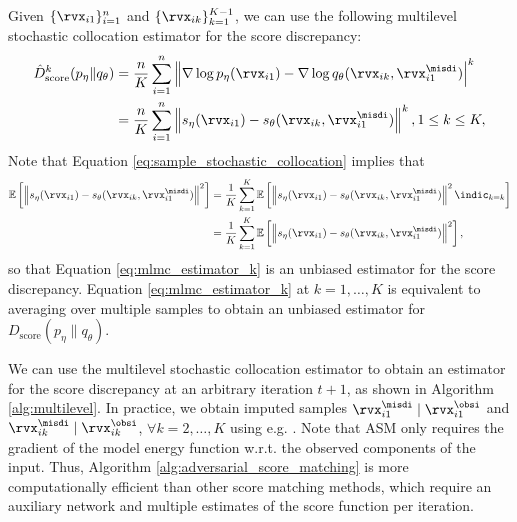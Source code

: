 \documentclass{article} %
\begin{document}
Given $\{\rvx_{i1}\}_{i=1}^{n}$ and $\{\rvx_{ik}\}_{k=1}^{K-1}$, we can use the following multilevel stochastic collocation estimator for the score discrepancy:
\begin{align}
	\hat{D}_{\text{\rm{score}}}^{k}(p_{\eta} \| q_{\theta}) &= \frac{n}{K} \sum_{i=1}^{n} \left\| \nabla \log p_{\eta}(\rvx_{i1}) - \nabla \log q_{\theta}(\rvx_{ik}, \rvx_{i1}^{\misdi}) \right|^{k} \label{eq:mlmc_estimator_k} \\
    & = \frac{n}{K} \sum_{i=1}^{n} \left\| s_{\eta}(\rvx_{i1}) - s_{\theta}(\rvx_{ik}, \rvx_{i1}^{\misdi}) \right\|^{k}, 1 \leq k \leq K, \notag
\end{align}
Note that Equation \eqref{eq:sample_stochastic_collocation} implies that 
\begin{align*}
	\mathbb{E} \left[ \left\| s_{\eta}(\rvx_{i1}) - s_{\theta}(\rvx_{ik}, \rvx_{i1}^{\misdi}) \right\|^{2}\right] & = \frac{1}{K} \sum_{k=1}^{K} \mathbb{E} \left[ \left\| s_{\eta}(\rvx_{i1}) - s_{\theta}(\rvx_{ik}, \rvx_{i1}^{\misdi}) \right\|^{2} \indic_{k=k} \right] \\ 
	& = \frac{1}{K} \sum_{k=1}^{K} \mathbb{E} \left[ \left\| s_{\eta}(\rvx_{i1}) - s_{\theta}(\rvx_{ik}, \rvx_{i1}^{\misdi}) \right\|^{2} \right],
\end{align*}
so that Equation \eqref{eq:mlmc_estimator_k} is an unbiased estimator for the score discrepancy.
Equation \eqref{eq:mlmc_estimator_k} at $k=1, \ldots, K$ is equivalent to averaging over multiple samples to obtain an unbiased estimator for $D_{\text{score}}(p_{\eta} \| q_{\theta})$.

We can use the multilevel stochastic collocation estimator to obtain an estimator for the score discrepancy at an arbitrary iteration $t+1$, as shown in Algorithm \ref{alg:multilevel}. In practice, we obtain imputed samples $\rvx_{i1}^{\misdi} \mid \rvx_{i1}^{\obsi}$ and $\rvx_{ik}^{\misdi} \mid \rvx_{ik}^{\obsi}$, $\forall k=2,\ldots,K$ using e.g. \citet{Song2019}. Note that ASM only requires the gradient of the model energy function w.r.t. the observed components of the input. Thus, Algorithm \ref{alg:adversarial_score_matching} is more computationally efficient than other score matching methods, which require an auxiliary network and multiple estimates of the score function per iteration.
\end{document}
